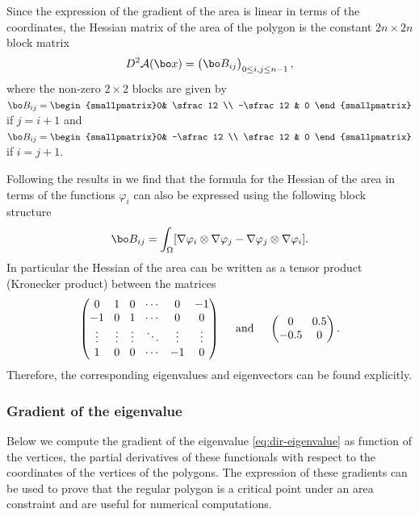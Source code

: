 Since the expression of the gradient of the area is linear in terms of the coordinates, the Hessian matrix of the area of the polygon is the constant $2n\times 2n$ block matrix
\begin{equation}
D^2 \mathcal A(\bo x) = \begin{pmatrix}
\bo B_{ij}
\end{pmatrix}_{0\leq i,j\leq n-1},
\label{eq:Hess_area}
\end{equation}
where the non-zero $2\times 2$ blocks are given by $\bo B_{ij} = \begin{smallpmatrix}0& \sfrac12 \\ -\sfrac12 & 0 \end{smallpmatrix}$ if $j = i+1$ and $\bo B_{ij} = \begin{smallpmatrix}0& -\sfrac12 \\ \sfrac12 & 0 \end{smallpmatrix}$ if $i = j+1$.

Following the results in \cite{laurain2ndDeriv} we find that the formula for the Hessian of the area in terms of the functions $\varphi_i$ can also be expressed using the following block structure
\begin{equation}
\bo B_{ij} = \int_\Omega [ \nabla \varphi_i \otimes \nabla \varphi_j - \nabla \varphi_j \otimes \nabla \varphi_i]
\label{eq:hess_area_phi}.
\end{equation}
In particular the Hessian of the area can be written as a tensor product (Kronecker product) between the matrices\enlargethispage{\baselineskip}
\[
\arraycolsep4.4pt \begin{pmatrix}
0 & 1 & 0 & \cdots & 0 & -1 \\
-1 & 0 & 1 & \cdots & 0 & 0\\
\vdots & \vdots & \vdots & \ddots & \vdots &
\vdots \\
1 & 0 & 0 & \cdots & -1 & 0
\end{pmatrix} \quad\text{ and }\quad \begin{pmatrix}
0 & 0.5 \\ -0.5 & 0
\end{pmatrix}.
\]
Therefore, the corresponding eigenvalues and eigenvectors can be found explicitly.

\subsubsection*{Gradient of the eigenvalue} Below we compute the gradient of the eigenvalue \eqref{eq:dir-eigenvalue} as function of the vertices, \ie the partial derivatives of these functionals with respect to the coordinates of the vertices of the polygons. The expression of these gradients can be used to prove that the regular polygon is a critical point under an area constraint and are useful for numerical computations.

